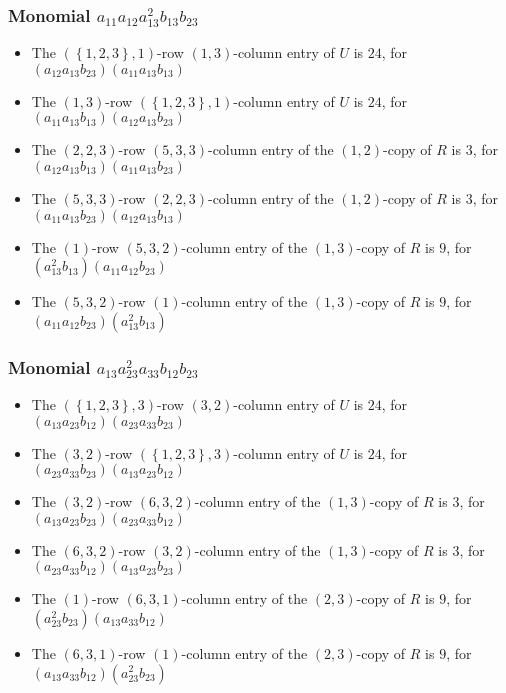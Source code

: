 \documentclass{article}
\begin{document}
\subsubsection{Monomial $ a_{11} a_{12} a_{13}^{2} b_{13} b_{23} $}

\begin{itemize}
\item The $ \left(\left\{1, 2, 3\right\}, 1\right) $-row $ \left(1, 3\right) $-column entry of $U$ is $ 24 $, for $( a_{12} a_{13} b_{23} )( a_{11} a_{13} b_{13} )$ 
\item The $ \left(1, 3\right) $-row $ \left(\left\{1, 2, 3\right\}, 1\right) $-column entry of $U$ is $ 24 $, for $( a_{11} a_{13} b_{13} )( a_{12} a_{13} b_{23} )$ 
\item The $(2, 2, 3)$-row $(5, 3, 3)$-column entry of the $ \left(1, 2\right) $-copy of $R$ is $ 3 $, for $( a_{12} a_{13} b_{13} )( a_{11} a_{13} b_{23} )$ 
\item The $(5, 3, 3)$-row $(2, 2, 3)$-column entry of the $ \left(1, 2\right) $-copy of $R$ is $ 3 $, for $( a_{11} a_{13} b_{23} )( a_{12} a_{13} b_{13} )$ 
\item The $(1)$-row $(5, 3, 2)$-column entry of the $ \left(1, 3\right) $-copy of $R$ is $ 9 $, for $( a_{13}^{2} b_{13} )( a_{11} a_{12} b_{23} )$ 
\item The $(5, 3, 2)$-row $(1)$-column entry of the $ \left(1, 3\right) $-copy of $R$ is $ 9 $, for $( a_{11} a_{12} b_{23} )( a_{13}^{2} b_{13} )$ 
\end{itemize}
\subsubsection{Monomial $ a_{13} a_{23}^{2} a_{33} b_{12} b_{23} $}

\begin{itemize}
\item The $ \left(\left\{1, 2, 3\right\}, 3\right) $-row $ \left(3, 2\right) $-column entry of $U$ is $ 24 $, for $( a_{13} a_{23} b_{12} )( a_{23} a_{33} b_{23} )$ 
\item The $ \left(3, 2\right) $-row $ \left(\left\{1, 2, 3\right\}, 3\right) $-column entry of $U$ is $ 24 $, for $( a_{23} a_{33} b_{23} )( a_{13} a_{23} b_{12} )$ 
\item The $(3, 2)$-row $(6, 3, 2)$-column entry of the $ \left(1, 3\right) $-copy of $R$ is $ 3 $, for $( a_{13} a_{23} b_{23} )( a_{23} a_{33} b_{12} )$ 
\item The $(6, 3, 2)$-row $(3, 2)$-column entry of the $ \left(1, 3\right) $-copy of $R$ is $ 3 $, for $( a_{23} a_{33} b_{12} )( a_{13} a_{23} b_{23} )$ 
\item The $(1)$-row $(6, 3, 1)$-column entry of the $ \left(2, 3\right) $-copy of $R$ is $ 9 $, for $( a_{23}^{2} b_{23} )( a_{13} a_{33} b_{12} )$ 
\item The $(6, 3, 1)$-row $(1)$-column entry of the $ \left(2, 3\right) $-copy of $R$ is $ 9 $, for $( a_{13} a_{33} b_{12} )( a_{23}^{2} b_{23} )$ 
\end{itemize}
\end{document}
